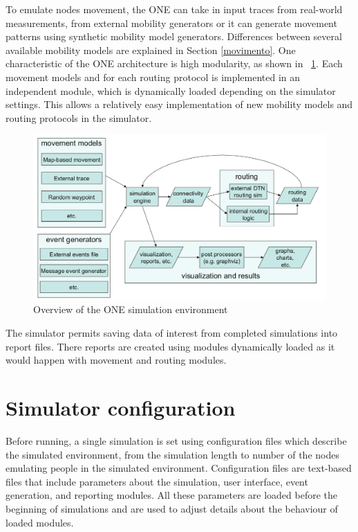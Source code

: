 To emulate nodes movement, the ONE can take in input traces from real-world measurements, from external mobility generators or it can generate movement patterns using synthetic mobility model generators. Differences between several available mobility models are explained in Section \ref{movimento}. One characteristic of the ONE architecture is high modularity, as shown in \figurename~\ref{overview-ONE}. Each movement models and for each routing protocol is implemented in an independent module, which is dynamically loaded depending on the simulator settings. This allows a relatively easy implementation of new mobility models and routing protocols in the simulator.
\\
\begin{figure}[htpb]
  \begin{center}
    \includegraphics[scale=0.3]{5-simulatore/img/overview.png}
    \caption{Overview of the ONE simulation environment \cite{articoloONE}}    
    \label{overview-ONE}
  \end{center}
\end{figure}

The simulator permits saving data of interest from completed simulations into report files. There reports are created using modules dynamically loaded as it would happen with movement and routing modules.
\\

\section{Simulator configuration}
\label{configurazioneONE}
Before running, a single simulation is set using configuration files which describe the simulated environment, from the simulation length to number of the nodes emulating people in the simulated environment. Configuration files are text-based files that include parameters about the simulation, user interface, event generation, and reporting modules. All these parameters are loaded before the beginning of simulations and are used to adjust details about the behaviour of loaded modules.
\\

